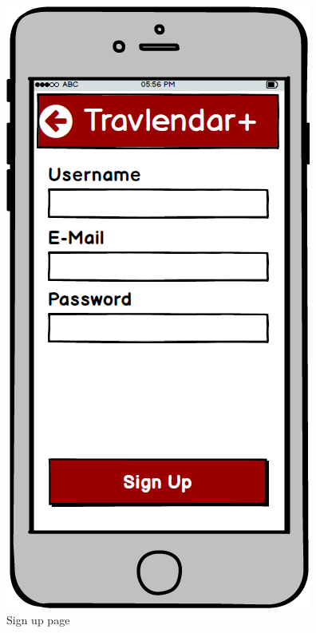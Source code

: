 \begin{figure}[!htb]
\begin{minipage}[b]{0.3\textwidth}
	\includegraphics[scale=0.3]{images/sign-up}
	\caption{Sign up page}
	\label{ref:signup}
\end{minipage}
\end{figure}


